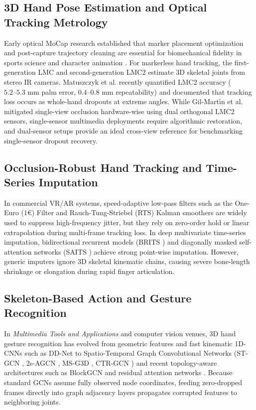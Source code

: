 \documentclass[10pt,twocolumn]{article}
\begin{document}
\subsection{3D Hand Pose Estimation and Optical Tracking Metrology}
Early optical MoCap research established that marker placement optimization and post-capture trajectory cleaning are essential for biomechanical fidelity in sports science and character animation \cite{bregler2007motion, tirakoat2011optimized, noiumkar2013use}. For markerless hand tracking, the first-generation LMC \cite{marin2016hand, boulahia2017dynamic} and second-generation LMC2 \cite{gilmartin2024duallmc2, matuszczyk2025lmc2} estimate 3D skeletal joints from stereo IR cameras. Matuszczyk et al. \cite{matuszczyk2025lmc2} recently quantified LMC2 accuracy ($5.2\text{--}5.3\text{ mm}$ palm error, $0.4\text{--}0.8\text{ mm}$ repeatability) and documented that tracking loss occurs as whole-hand dropouts at extreme angles. While Gil-Mart{\'\i}n et al. \cite{gilmartin2024duallmc2} mitigated single-view occlusion hardware-wise using dual orthogonal LMC2 sensors, single-sensor multimedia deployments require algorithmic restoration, and dual-sensor setups provide an ideal cross-view reference for benchmarking single-sensor dropout recovery.

\subsection{Occlusion-Robust Hand Tracking and Time-Series Imputation}
In commercial VR/AR systems, speed-adaptive low-pass filters such as the One-Euro ($1\text{€}$) Filter \cite{casiez2012oneeuro} and Rauch-Tung-Striebel (RTS) Kalman smoothers are widely used to suppress high-frequency jitter, but they rely on zero-order hold or linear extrapolation during multi-frame tracking loss. In deep multivariate time-series imputation, bidirectional recurrent models (BRITS \cite{cao2018brits}) and diagonally masked self-attention networks (SAITS \cite{du2023saits}) achieve strong point-wise imputation. However, generic imputers ignore 3D skeletal kinematic chains, causing severe bone-length shrinkage or elongation during rapid finger articulation.

\subsection{Skeleton-Based Action and Gesture Recognition}
In \textit{Multimedia Tools and Applications} and computer vision venues, 3D hand gesture recognition has evolved from geometric features \cite{marin2016hand, boulahia2017dynamic, kumar2018position} and fast kinematic 1D-CNNs such as DD-Net \cite{yang2019ddnet} to Spatio-Temporal Graph Convolutional Networks (ST-GCN \cite{yan2018spatial}, 2s-AGCN \cite{shi2019twostream}, MS-G3D \cite{liu2020msg3d}, CTR-GCN \cite{chen2021ctrgcn}) and recent topology-aware architectures such as BlockGCN \cite{zhou2024blockgcn} and residual attention networks \cite{asteasuain2022applying, liu2024novel, rastgoo2025deep, dhanjal2025multilingual}. Because standard GCNs assume fully observed node coordinates, feeding zero-dropped frames directly into graph adjacency layers propagates corrupted features to neighboring joints.
\end{document}
